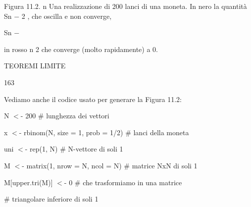 \documentclass[a4paper,portrait,12pt]{article}
\begin{document}
\begin{flushleft}
Figura 11.2. n Una realizzazione di 200 lanci di una moneta. In nero la quantit\`{a} Sn $-$ 2 , che oscilla e non converge,
\end{flushleft}


\begin{flushleft}
Sn $-$
\end{flushleft}


\begin{flushleft}
in rosso n 2 che converge (molto rapidamente) a 0.
\end{flushleft}





\begin{flushleft}
 TEOREMI LIMITE
\end{flushleft}





163





\begin{flushleft}
Vediamo anche il codice usato per generare la Figura 11.2:
\end{flushleft}





\begin{flushleft}
N $<$- 200 \# lunghezza dei vettori
\end{flushleft}


\begin{flushleft}
x $<$- rbinom(N, size = 1, prob = 1/2) \# lanci della moneta
\end{flushleft}


\begin{flushleft}
uni $<$- rep(1, N) \# N-vettore di soli 1
\end{flushleft}


\begin{flushleft}
M $<$- matrix(1, nrow = N, ncol = N) \# matrice NxN di soli 1
\end{flushleft}


\begin{flushleft}
M[upper.tri(M)] $<$- 0 \# che trasformiamo in una matrice
\end{flushleft}


\begin{flushleft}
\# triangolare inferiore di soli 1
\end{flushleft}
\end{document}
